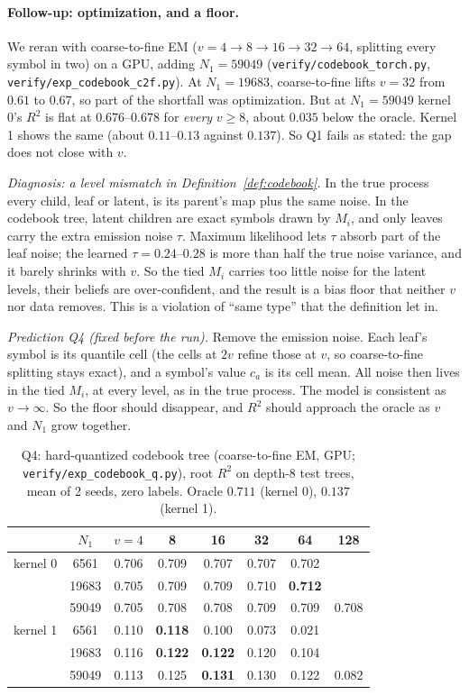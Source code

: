 \documentclass[11pt]{article}
\theoremstyle{definition}
\begin{document}
\paragraph{Follow-up: optimization, and a floor.} We reran with coarse-to-fine EM ($v=4\to8\to16\to32
\to64$, splitting every symbol in two) on a GPU, adding $N_1=59049$ (\texttt{verify/codebook\_torch.py},
\texttt{verify/exp\_codebook\_c2f.py}). At $N_1=19683$, coarse-to-fine lifts $v=32$ from $0.61$ to
$0.67$, so part of the shortfall was optimization. But at $N_1=59049$ kernel 0's $R^2$ is flat at
$0.676$--$0.678$ for \emph{every} $v\ge8$, about $0.035$ below the oracle. Kernel 1 shows the same
(about $0.11$--$0.13$ against $0.137$). So Q1 fails as stated: the gap does not close with $v$.

\emph{Diagnosis: a level mismatch in Definition~\ref{def:codebook}.} In the true process every child,
leaf or latent, is its parent's map plus the same noise. In the codebook tree, latent children are
exact symbols drawn by $M_i$, and only leaves carry the extra emission noise $\tau$. Maximum likelihood
lets $\tau$ absorb part of the leaf noise; the learned $\tau=0.24$--$0.28$ is more than half the true
noise variance, and it barely shrinks with $v$. So the tied $M_i$ carries too little noise for the
latent levels, their beliefs are over-confident, and the result is a bias floor that neither $v$ nor
data removes. This is a violation of ``same type'' that the definition let in.

\emph{Prediction Q4 (fixed before the run).} Remove the emission noise. Each leaf's symbol is its
quantile cell (the cells at $2v$ refine those at $v$, so coarse-to-fine splitting stays exact), and a
symbol's value $c_a$ is its cell mean. All noise then lives in the tied $M_i$, at every level, as in
the true process. The model is consistent as $v\to\infty$. So the floor should disappear, and $R^2$
should approach the oracle as $v$ and $N_1$ grow together.

\begin{table}[h]\centering
\caption{Q4: hard-quantized codebook tree (coarse-to-fine EM, GPU; \texttt{verify/exp\_codebook\_q.py}),
root $R^2$ on depth-8 test trees, mean of 2 seeds, zero labels. Oracle $0.711$ (kernel 0), $0.137$
(kernel 1).}\label{tab:q4}
\small\begin{tabular}{cc|cccccc}\toprule
& $N_1$ & $v=4$ & 8 & 16 & 32 & 64 & 128\\\midrule
kernel 0 & 6561 & 0.706 & 0.709 & 0.707 & 0.707 & 0.702 & \\
& 19683 & 0.705 & 0.709 & 0.709 & 0.710 & \textbf{0.712} & \\
& 59049 & 0.705 & 0.708 & 0.708 & 0.709 & 0.709 & 0.708\\\midrule
kernel 1 & 6561 & 0.110 & \textbf{0.118} & 0.100 & 0.073 & 0.021 & \\
& 19683 & 0.116 & \textbf{0.122} & \textbf{0.122} & 0.120 & 0.104 & \\
& 59049 & 0.113 & 0.125 & \textbf{0.131} & 0.130 & 0.122 & 0.082\\
\bottomrule\end{tabular}
\end{table}
\end{document}

